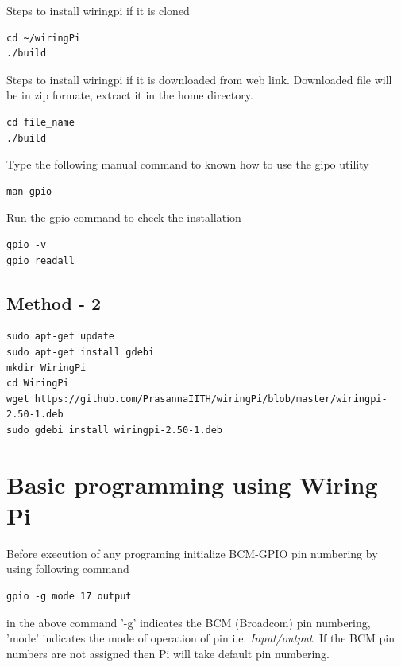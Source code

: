 \documentclass[journal,12pt,twocolumn]{IEEEtran}
\begin{document}
Steps to install wiringpi if it is cloned
\begin{lstlisting}[frame = single]
cd ~/wiringPi
./build
\end{lstlisting}

Steps to install wiringpi if it is downloaded from web link. Downloaded file will be in zip formate, extract it in the home directory.
\begin{lstlisting}[frame = single]
cd file_name
./build
\end{lstlisting}

Type the following manual command to known how to use the gipo utility 
\begin{lstlisting}[frame= single]
man gpio
\end{lstlisting}


Run the gpio command to check the installation
\begin{lstlisting}[frame = single]
gpio -v
gpio readall
\end{lstlisting}

\subsection*{Method - 2}
\begin{lstlisting}
sudo apt-get update
sudo apt-get install gdebi
mkdir WiringPi
cd WiringPi
wget https://github.com/PrasannaIITH/wiringPi/blob/master/wiringpi-2.50-1.deb
sudo gdebi install wiringpi-2.50-1.deb
\end{lstlisting}

\section{Basic programming using Wiring Pi}
Before execution of any programing initialize BCM-GPIO pin numbering by using following command
\begin{lstlisting}[frame = single]
gpio -g mode 17 output
\end{lstlisting}
in the above command '-g' indicates the BCM (Broadcom) pin numbering, 'mode' indicates the mode of operation of pin i.e. \textit{Input/output}. If the BCM pin numbers are not assigned then Pi will take default pin numbering.
\end{document}
